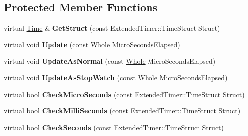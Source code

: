 \subsection*{Protected Member Functions}
\begin{DoxyCompactItemize}
\item 
\hypertarget{classphys_1_1ExtendedTimer_a94f3140d4eba930ed76cc530b4f847b7}{
virtual \hyperlink{structphys_1_1Time}{Time} \& {\bfseries GetStruct} (const ExtendedTimer::TimeStruct Struct)}
\label{dc/d7c/classphys_1_1ExtendedTimer_a94f3140d4eba930ed76cc530b4f847b7}

\item 
\hypertarget{classphys_1_1ExtendedTimer_ac5e604ad911911939ba190520f8c3399}{
virtual void {\bfseries Update} (const \hyperlink{namespacephys_a460f6bc24c8dd347b05e0366ae34f34a}{Whole} MicroSecondsElapsed)}
\label{dc/d7c/classphys_1_1ExtendedTimer_ac5e604ad911911939ba190520f8c3399}

\item 
\hypertarget{classphys_1_1ExtendedTimer_af790c2d0fdaf009b77b8a351ab95026e}{
virtual void {\bfseries UpdateAsNormal} (const \hyperlink{namespacephys_a460f6bc24c8dd347b05e0366ae34f34a}{Whole} MicroSecondsElapsed)}
\label{dc/d7c/classphys_1_1ExtendedTimer_af790c2d0fdaf009b77b8a351ab95026e}

\item 
\hypertarget{classphys_1_1ExtendedTimer_a2df54619bf6a74d8c44c877352b3f323}{
virtual void {\bfseries UpdateAsStopWatch} (const \hyperlink{namespacephys_a460f6bc24c8dd347b05e0366ae34f34a}{Whole} MicroSecondsElapsed)}
\label{dc/d7c/classphys_1_1ExtendedTimer_a2df54619bf6a74d8c44c877352b3f323}

\item 
\hypertarget{classphys_1_1ExtendedTimer_a4ae8b42ab14c7eb0b667968362eb9fbc}{
virtual bool {\bfseries CheckMicroSeconds} (const ExtendedTimer::TimeStruct Struct)}
\label{dc/d7c/classphys_1_1ExtendedTimer_a4ae8b42ab14c7eb0b667968362eb9fbc}

\item 
\hypertarget{classphys_1_1ExtendedTimer_ac70c02c75c9172a16dbd1dd3cdc1c554}{
virtual bool {\bfseries CheckMilliSeconds} (const ExtendedTimer::TimeStruct Struct)}
\label{dc/d7c/classphys_1_1ExtendedTimer_ac70c02c75c9172a16dbd1dd3cdc1c554}

\item 
\hypertarget{classphys_1_1ExtendedTimer_a2a2d9aa7baacdd86f0007510e8808db9}{
virtual bool {\bfseries CheckSeconds} (const ExtendedTimer::TimeStruct Struct)}
\label{dc/d7c/classphys_1_1ExtendedTimer_a2a2d9aa7baacdd86f0007510e8808db9}


\end{DoxyCompactItemize}
